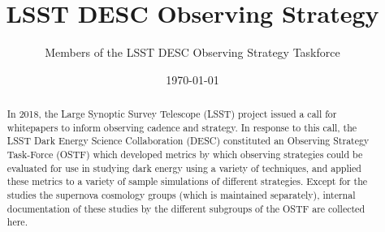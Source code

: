 \documentclass[modern,skiphelvet]{lsstdescnote}
\begin{document}
\title{LSST DESC Observing Strategy}
\author{Members of the LSST DESC Observing Strategy Taskforce}
\date{\today}

\maketitle

\begin{abstract}
In 2018, the Large Synoptic Survey Telescope (LSST) project issued a
call for whitepapers to inform observing cadence and strategy. In
response to this call, the LSST Dark Energy Science Collaboration
(DESC) constituted an Observing Strategy Task-Force (OSTF) which
developed metrics by which observing strategies could be evaluated for
use in studying dark energy using a variety of techniques, and applied
these metrics to a variety of sample simulations of different
strategies. Except for the studies the supernova cosmology groups
(which is maintained separately), internal documentation of these
studies by the different subgroups of the OSTF are collected here.
\end{abstract}

\pagebreak
\tableofcontents

\pagebreak


\pagebreak


\pagebreak

\pagebreak

\pagebreak

\pagebreak

\pagebreak


% 

\pagebreak

\pagebreak

\pagebreak

% 



\end{document}

